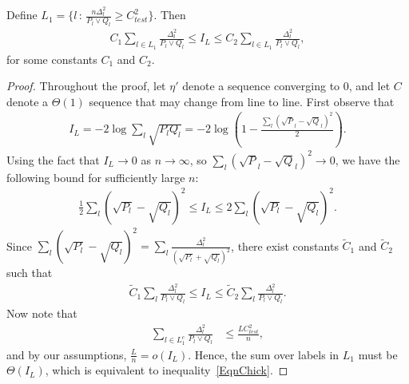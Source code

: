\documentclass{article}
\begin{document}
\begin{lemma}\label{lem:friday_night}
Define $L_1 = \{ l \,:\, \frac{n \Delta_l^2}{P_l \vee Q_l} \geq C_{test}^2 \}$. Then 
\begin{align}
\label{EqnChick}
 C_1\sum_{l \in L_1} \frac{\Delta_l^2}{P_l \vee Q_l} \leq I_L \leq  C_2 \sum_{l \in L_1} \frac{\Delta_l^2}{P_l \vee Q_l},
 \end{align}
for some constants $C_1$ and $C_2$. 
\end{lemma}
\begin{proof}
Throughout the proof, let $\eta'$ denote a sequence converging to 0, and let $C$ denote a $\Theta(1)$ sequence that may change from line to line. First observe that
\begin{align*}
I_L  = -2 \log \sum_l \sqrt{P_l Q_l} = -2 \log \left( 1 - \frac{\sum_l (\sqrt P_l - \sqrt Q_l)^2}{2}\right).
\end{align*}
Using the fact that $I_L \to 0$ as $n \to \infty$, so $\sum_l (\sqrt P_l - \sqrt Q_l)^2 \to 0$, we have the following bound for sufficiently large $n$:
\begin{align*}
\frac{1}{2} \sum_l (\sqrt{P_l} - \sqrt{Q_l} )^2 \leq I_L \leq 2 \sum_l (\sqrt{P_l} - \sqrt{Q_l} )^2.
 \end{align*}
Since $\sum_l (\sqrt{P_l} - \sqrt{Q_l} )^2 = \sum_l \frac{\Delta_l^2}{(\sqrt{P_l} + \sqrt{Q_l})^2}$, there exist constants $\tilde C_1$ and $ \tilde C_2$ such that
\begin{align*}
\tilde C_1\sum_{l } \frac{\Delta_l^2}{P_l \vee Q_l} \leq I_L \leq  \tilde C_2 \sum_{l } \frac{\Delta_l^2}{P_l \vee Q_l}.
\end{align*}
Now note that
\begin{align*}
\sum_{l \in L_1^c} \frac{\Delta_l^2}{P_l \vee Q_l} &\leq \frac{LC_{test}^2}{n},
\end{align*}
and by our assumptions, $\frac{L}{n} = o(I_L)$. Hence, the sum over labels in $L_1$ must be $\Theta(I_L)$, which is equivalent to inequality~\eqref{EqnChick}.
\end{proof}
\end{document}
